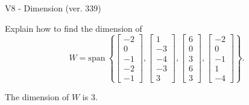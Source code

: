 \begin{exercise}
  \begin{exerciseTitle}V8 - Dimension (ver. 339)\end{exerciseTitle}
  \begin{exerciseStatement}
    Explain how to find the dimension of 
\[W=\mathrm{span}\ \left\{\left[\begin{array}{r}
-2 \\
0 \\
-1 \\
-2 \\
-1
\end{array}\right] , \left[\begin{array}{r}
1 \\
-3 \\
-4 \\
-3 \\
3
\end{array}\right] , \left[\begin{array}{r}
6 \\
0 \\
3 \\
6 \\
3
\end{array}\right] , \left[\begin{array}{r}
-2 \\
0 \\
-1 \\
1 \\
-4
\end{array}\right]\right\}.\]



  \end{exerciseStatement}
  \begin{exerciseAnswer}
   The dimension of \(W\) is  \(3\).
  


  \end{exerciseAnswer}
\end{exercise}